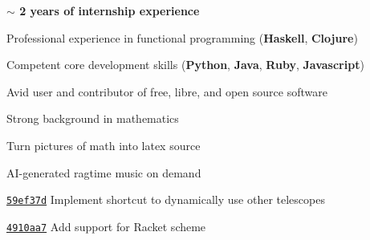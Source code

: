 
\begin{tightitemize}
\item \textbf{$\sim$ 2 years of internship experience}
    \item Professional experience in functional programming (\textbf{Haskell}, 
        \textbf{Clojure})
    \item Competent core development skills (\textbf{Python}, \textbf{Java}, 
    \textbf{Ruby}, \textbf{Javascript})
    \item Avid user and contributor of free, libre, and open source software
    \item Strong background in mathematics
\end{tightitemize}

\bigskip
{}

Turn pictures of math into latex source

\smalldivider

AI-generated ragtime music on demand

\smallskip




\href{https://github.com/nvim-lua/telescope.nvim/commit/59ef37ded43a77a4c0f35be434f1ea72a407ce84}{\texttt{59ef37d}} 
Implement shortcut to dynamically use other telescopes

\smalldivider

\href{https://github.com/ujihisa/repl.vim/commit/4910aa7d7b0c7abda92dcfdb4cde030fb839091d}{\texttt{4910aa7}} 
Add support for Racket scheme

\smallskip
{}

\smallskip
{}

